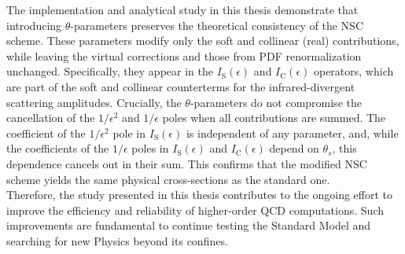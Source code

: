 The implementation and analytical study in this thesis demonstrate that introducing $\theta$-parameters preserves the theoretical consistency of the NSC scheme. These parameters modify only the soft and collinear (real) contributions, while leaving the virtual corrections and those from PDF renormalization unchanged. Specifically, they appear in the $I_{\mathrm{S}}(\epsilon)$ and $I_{\mathrm{C}}(\epsilon)$ operators, which are part of the soft and collinear counterterms for the infrared-divergent scattering amplitudes. Crucially, the $\theta$-parameters do not compromise the cancellation of the $1/\epsilon^2$ and $1/\epsilon$ poles when all contributions are summed. The coefficient of the $1/\epsilon^2$ pole in $I_{\mathrm{S}}(\epsilon)$ is independent of any parameter, and, while the coefficients of the $1/\epsilon$ poles in $I_{\mathrm{S}}(\epsilon)$ and $I_{\mathrm{C}}(\epsilon)$ depend on $\theta_s$, this dependence cancels out in their sum. This confirms that the modified NSC scheme yields the same physical cross-sections as the standard one. \\
Therefore, the study presented in this thesis contributes to the ongoing effort to improve the efficiency and reliability of higher-order QCD computations. Such improvements are fundamental to continue testing the Standard Model and searching for new Physics beyond its confines.
